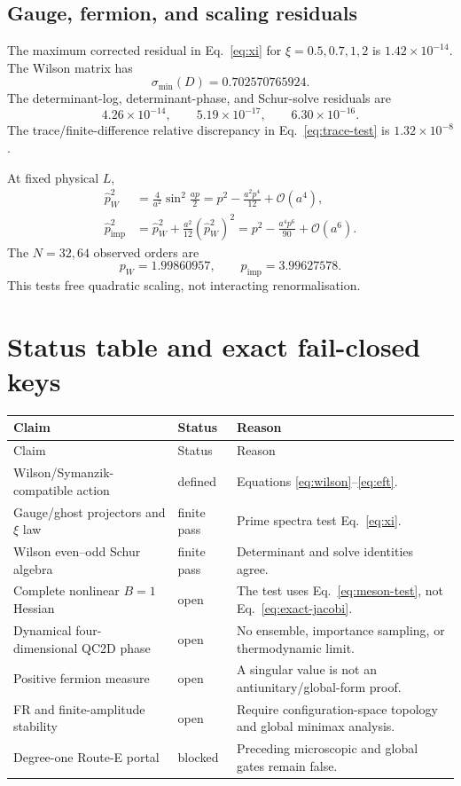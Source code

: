 \documentclass[11pt]{article}
\theoremstyle{definition}
\theoremstyle{remark}
\begin{document}
\subsection{Gauge, fermion, and scaling residuals}

The maximum corrected residual in Eq.~\eqref{eq:xi} for
\(\xi=0.5,0.7,1,2\) is \(1.42\times10^{-14}\).
The Wilson matrix has
\[
 \sigma_{\min}(D)=0.702570765924.
\]
The determinant-log, determinant-phase, and Schur-solve residuals are
\[
 4.26\times10^{-14},\qquad
 5.19\times10^{-17},\qquad
 6.30\times10^{-16}.
\]
The trace/finite-difference relative discrepancy in
Eq.~\eqref{eq:trace-test} is \(1.32\times10^{-8}\).

At fixed physical \(L\),
\begin{align}
 \widehat p_W^2
 &=\frac4{a^2}\sin^2\frac{ap}{2}
 =p^2-\frac{a^2p^4}{12}+\mathcal O(a^4),\nonumber\\
 \widehat p_{\mathrm{imp}}^2
 &=\widehat p_W^2+\frac{a^2}{12}(\widehat p_W^2)^2
 =p^2-\frac{a^4p^6}{90}+\mathcal O(a^6).
 \label{eq:dispersion}
\end{align}
The \(N=32,64\) observed orders are
\[
 p_W=1.99860957,\qquad
 p_{\mathrm{imp}}=3.99627578.
\]
This tests free quadratic scaling, not interacting renormalisation.

\section{Status table and exact fail-closed keys}

\begin{longtable}{@{}L{0.43\textwidth}L{0.14\textwidth}L{0.35\textwidth}@{}}
\toprule
Claim & Status & Reason\\
\midrule
\endfirsthead
\toprule
Claim & Status & Reason\\
\midrule
\endhead
Wilson/Symanzik-compatible action & defined &
Equations \eqref{eq:wilson}--\eqref{eq:eft}.\\
Gauge/ghost projectors and \(\xi\) law & finite pass &
Prime spectra test Eq.~\eqref{eq:xi}.\\
Wilson even--odd Schur algebra & finite pass &
Determinant and solve identities agree.\\
Complete nonlinear \(B=1\) Hessian & open &
The test uses Eq.~\eqref{eq:meson-test}, not
Eq.~\eqref{eq:exact-jacobi}.\\
Dynamical four-dimensional QC2D phase & open &
No ensemble, importance sampling, or thermodynamic limit.\\
Positive fermion measure & open &
A singular value is not an antiunitary/global-form proof.\\
FR and finite-amplitude stability & open &
Require configuration-space topology and global minimax analysis.\\
Degree-one Route-E portal & blocked &
Preceding microscopic and global gates remain false.\\
\bottomrule
\end{longtable}
\end{document}
